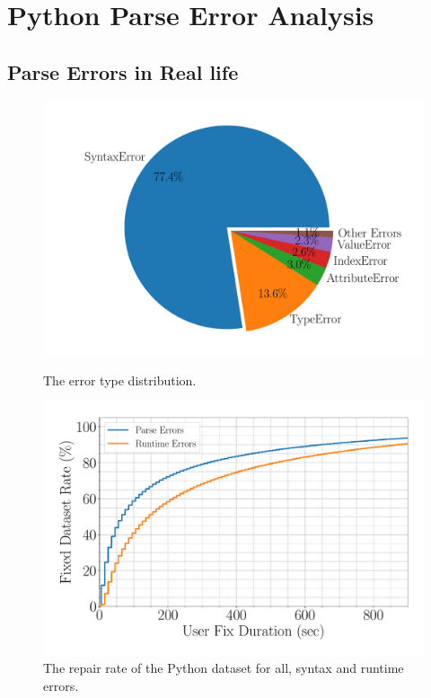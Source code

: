 \section{Python Parse Error Analysis}
\label{sec:error-analysis}

\subsection{Parse Errors in Real life}
\label{sec:error-analysis:syntax}

\begin{figure}[t]
  \centering
  \begin{minipage}[c]{0.49\linewidth}
    \centering
    \includegraphics[width=\linewidth]{error-pie.pdf}
    \caption{The error type distribution.}
    \label{fig:error-statistics}
  \end{minipage}
  \begin{minipage}[c]{0.5\linewidth}
      \centering
      \includegraphics[width=\linewidth]{fixed-rate.pdf}
      \caption{The repair rate of the Python dataset for all, syntax and runtime
      errors.}
      \label{fig:repair-rate}
  \end{minipage}
\end{figure}

